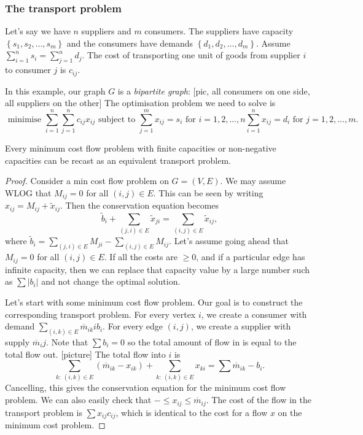 \documentclass[a4paper]{scrartcl}
\begin{document}
\subsubsection{The transport problem}
Let's say we have $n$ suppliers and $m$ consumers. The suppliers have capacity $\left\{s_1 , s_2 , \ldots , s_m\right\}$ and the consumers have demands $\left\{d_1 ,d_2 , \ldots , d_m\right\}$. Assume $\sum_{i=1}^{n}s_i=\sum_{j=1}^{n}d_j$. The cost of transporting one unit of goods from supplier $i$ to consumer $j$ is $c_{ij}$. 

In this example, our graph $G$ is a \emph{bipartite graph}: 
[pic, all consumers on one side, all suppliers on the other]
The optimisation problem we need to solve is \[
\text{ minimise } \sum_{i=1}^{n} \sum_{j=1}^{n} c_{ij} x_{ij} \text{ subject to } \sum_{j=1}^{m}x_{ij}=s_i \text{ for } i=1,2, \ldots ,n \sum_{i=1}^{n}x_{ij}=d_i \text{ for } j=1,2,\ldots ,m
.\] 
\begin{theorem}
	 Every minimum cost flow problem with finite capacities or non-negative capacities can be recast as an equivalent transport problem. 
\end{theorem}
\begin{proof}
	 Consider a min cost flow problem on $G=(V,E)$. We may assume WLOG that $M_{ij}=0$ for all $(i,j)\in E$. This can be seen by writing $x_{ij}=M_{ij}+\widetilde{x}_{ij}$. Then the conservation equation becomes \[
	 \widetilde{b}_i+\sum_{(j,i) \in E} \widetilde{x}_{ji}=\sum_{(i,j) \in E} \widetilde{x}_{ij}
	 ,\]  where $\widetilde{b}_{i}=\sum_{(j,i) \in E}M_{ji}-\sum_{(i,j) \in E}M_{ij}$. Let's assume going ahead that $M_{ij}=0$ for all $(i,j) \in E$. If all the costs are $\geq 0$, and if a particular edge has infinite capacity, then we can replace that capacity value by a large number such as $\sum |b_{i}|$ and not change the optimal solution.

	 Let's start with some minimum cost flow problem. Our goal is to construct the corresponding transport problem. For every vertex $i$, we create a consumer with demand $\sum_{(i,k)\in E}^{}\overline{m}_{ik} i b_{i}$. For every edge $(i,j)$, we create a supplier with supply $\overline{m}_ij$. Note that $\sum b_{i}=0$ so the total amount of flow in is equal to the total flow out. [picture] The total flow into $i$ is \[
	 \sum_{k: \ (i,k) \in E} (\overline{m}_{ik}-x_{ik})+\sum_{k: \ (i,k) \in E} x_{ki}=\sum \overline{m}_{ik} - b_{i}
	 .\]  
	 Cancelling, this gives the conservation equation for the minimum cost flow problem. We can also easily check that $- \leq x_{ij} \leq \overline{m}_{ij}$. The cost of the flow in the transport problem is $\sum x_{ij}c_{ij}$, which is identical to the cost for a flow $x$ on the minimum cost problem. 
\end{proof}
\end{document}
